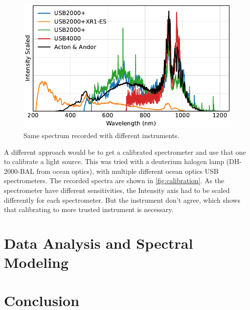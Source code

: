\documentclass[
	parskip=half,
	a4paper,
]{scrarticle}
\begin{document}
\begin{figure}[hb]
    \centering
    \includegraphics{../analysis/figures/efficiency_different.pdf}
    \caption{Same spectrum recorded with different instruments.}
    \label{fig:calibration}
\end{figure}
A different approach would be to get a calibrated spectrometer and use that one to calibrate a light source. This was tried with a deuterium halogen lamp (DH-2000-BAL from ocean optics), with multiple different ocean optics USB spectrometers.
The recorded spectra are shown in \autoref{fig:calibration}. 
As the spectrometer have different sensitivities, the Intensity axis had to be scaled differently for each spectrometer. But the instrument don't agree, which shows that calibrating to more trusted instrument is necessary.


\clearpage
\section{Data Analysis and Spectral Modeling}

\clearpage
\section{Conclusion}

\clearpage
\printbibliography
\end{document}
